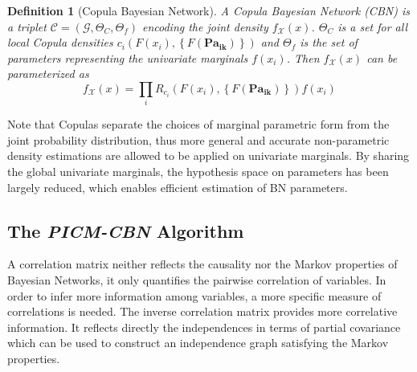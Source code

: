 \documentclass{article}
\newtheorem{definition}[theorem]{Definition}
\begin{document}
\begin{definition}[Copula Bayesian Network]
A Copula Bayesian Network (CBN) \cite{ElidanCopula} is a triplet $\mathcal{C}=(\mathcal{G}, \Theta_C, \Theta_f)$ encoding the joint density $f_\mathcal{X}(x)$. $\Theta_C$ is a set for all local Copula densities $c_i(F(x_i),\left\lbrace F(\mathbf{Pa_{ik}})\right\rbrace)$ and $\Theta_f$ is the set of parameters representing the univariate marginals $f(x_i)$. Then $f_\mathcal{X}(x)$ can be parameterized as
\[
f_\mathcal{X}(x)=\prod_i R_{c_i}(F(x_i),\left\lbrace F(\mathbf{Pa_{ik}})\right\rbrace)f(x_i)
\]
\end{definition}
Note that Copulas separate the choices of marginal parametric form from the joint probability distribution, thus more general and accurate non-parametric density estimations are allowed to be applied on univariate marginals. By sharing the global univariate marginals, the hypothesis space on parameters has been largely reduced, which enables efficient estimation of BN parameters.



\subsection{The \textit{PICM-CBN} Algorithm}
\label{subsec:picm}
A correlation matrix neither reflects the causality nor the Markov properties of Bayesian Networks, it only quantifies the pairwise correlation of variables. In order to infer more information among variables, a more specific measure of correlations is needed. The inverse correlation matrix \cite{JoeGMBook} provides more correlative information. It reflects directly the independences in terms of partial covariance which can be used to construct an independence graph satisfying the Markov properties. 
\end{document}
